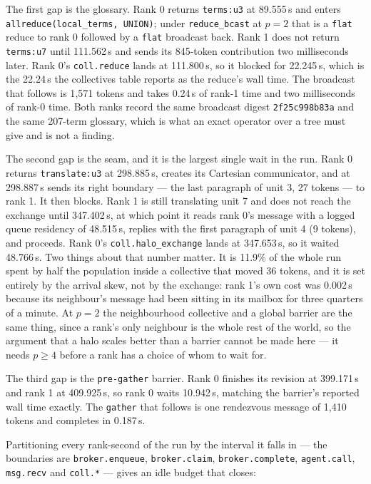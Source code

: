 \documentclass[11pt]{article}
\begin{document}
The first gap is the glossary. Rank 0 returns \texttt{terms:u3} at 89.555\,s and enters
\texttt{allreduce(local\_terms, UNION)}; under \texttt{reduce\_bcast} at $p=2$ that is a
\texttt{flat} reduce to rank 0 followed by a \texttt{flat} broadcast back. Rank 1 does not return
\texttt{terms:u7} until 111.562\,s and sends its 845-token contribution two milliseconds later.
Rank 0's \texttt{coll.reduce} lands at 111.800\,s, so it blocked for 22.245\,s, which is the
22.24\,s the collectives table reports as the reduce's wall time. The broadcast that follows is
1{,}571 tokens and takes 0.24\,s of rank-1 time and two milliseconds of rank-0 time. Both ranks
record the same broadcast digest \texttt{2f25c998b83a} and the same 207-term glossary, which is
what an exact operator over a tree must give and is not a finding.

The second gap is the seam, and it is the largest single wait in the run. Rank 0 returns
\texttt{translate:u3} at 298.885\,s, creates its Cartesian communicator, and at 298.887\,s sends
its right boundary --- the last paragraph of unit 3, 27 tokens --- to rank 1. It then blocks.
Rank 1 is still translating unit 7 and does not reach the exchange until 347.402\,s, at which
point it reads rank 0's message with a logged queue residency of 48.515\,s, replies with the
first paragraph of unit 4 (9 tokens), and proceeds. Rank 0's \texttt{coll.halo\_exchange} lands
at 347.653\,s, so it waited 48.766\,s. Two things about that number matter. It is 11.9\% of the
whole run spent by half the population inside a collective that moved 36 tokens, and it is set
entirely by the arrival skew, not by the exchange: rank 1's own cost was 0.002\,s because its
neighbour's message had been sitting in its mailbox for three quarters of a minute. At $p=2$ the
neighbourhood collective and a global barrier are the same thing, since a rank's only neighbour
is the whole rest of the world, so the argument that a halo scales better than a barrier cannot
be made here --- it needs $p\ge4$ before a rank has a choice of whom to wait for.

The third gap is the \texttt{pre-gather} barrier. Rank 0 finishes its revision at 399.171\,s and
rank 1 at 409.925\,s, so rank 0 waits 10.942\,s, matching the barrier's reported wall time
exactly. The \texttt{gather} that follows is one rendezvous message of 1{,}410 tokens and
completes in 0.187\,s.

Partitioning every rank-second of the run by the interval it falls in --- the boundaries are
\texttt{broker.enqueue}, \texttt{broker.claim}, \texttt{broker.complete}, \texttt{agent.call},
\texttt{msg.recv} and \texttt{coll.*} --- gives an idle budget that closes:
\end{document}
